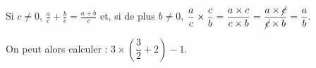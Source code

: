 Si $c \neq 0$, $\frac{a}{c} + \frac{b}{c} = \frac{a+b}{c}$ et, si de plus
$b \neq 0$, $\dfrac{a}{c} \times \dfrac{c}{b} = \dfrac{a \times c}{c \times b}
=\dfrac{a \times \cancel{c}}{\cancel{c}\times b} = \dfrac a b.$\medskip

On peut alors calculer : $3 \times \left(\dfrac 3 2 + 2\right) - 1$.